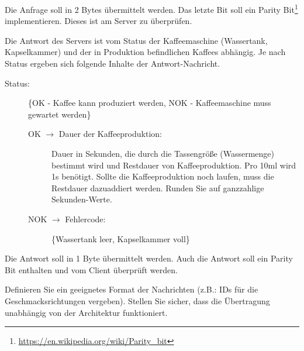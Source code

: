 Die Anfrage soll in 2 Bytes übermittelt werden. Das letzte Bit soll ein Parity
Bit\footnote{\url{https://en.wikipedia.org/wiki/Parity_bit}}
implementieren. Dieses ist am Server zu überprüfen.

Die Antwort des Servers ist vom Status der Kaffeemaschine (Wassertank,
Kapselkammer) und der in Produktion befindlichen Kaffees abhängig. Je nach
Status ergeben sich folgende Inhalte der Antwort-Nachricht.
%
\begin{description}
\item[Status:] \{OK - Kaffee kann produziert werden, NOK - Kaffeemaschine muss
  gewartet werden\}
  \begin{description}
  \item[OK $\rightarrow$ Dauer der Kaffeeproduktion:] Dauer in Sekunden, die
    durch die Tassengröße (Wassermenge) bestimmt wird und Restdauer von
    Kaffeeproduktion. Pro 10ml wird 1s benötigt. Sollte die Kaffeeproduktion
    noch laufen, muss die Restdauer dazuaddiert werden. Runden Sie auf
    ganzzahlige Sekunden-Werte.
  \item[NOK $\rightarrow$ Fehlercode:] \{Wassertank leer, Kapselkammer voll\}
  \end{description}
\end{description}

Die Antwort soll in 1 Byte übermittelt werden. Auch die Antwort soll ein Parity
Bit enthalten und vom Client überprüft werden.

Definieren Sie ein geeignetes Format der Nachrichten (z.B.: IDs für die
Geschmacksrichtungen vergeben). Stellen Sie sicher, dass die Übertragung
unabhängig von der Architektur funktioniert.



\osueguidelinesone


